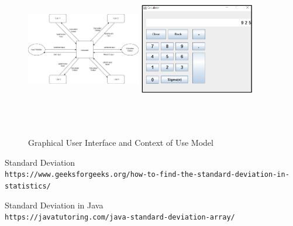 \documentclass[12pt]{report}
\begin{document}
\begin{figure}[h!]
\begin{center}
  \includegraphics[width=5cm, height=7cm]{Context of Use Model.jpg} 
   \includegraphics[width=5cm, height=7cm]{images/Graphical Interface.png} 
  \end{center}
  \caption{\vspace{0.8 cm}Graphical User Interface and Context of Use Model}
\end{figure}

\begin{thebibliography}{9}
Standard Deviation
\\\texttt{https://www.geeksforgeeks.org/how-to-find-the-standard-deviation-in-statistics/}

Standard Deviation in Java
\\\texttt{https://javatutoring.com/java-standard-deviation-array/}



\end{thebibliography}
\end{document}
